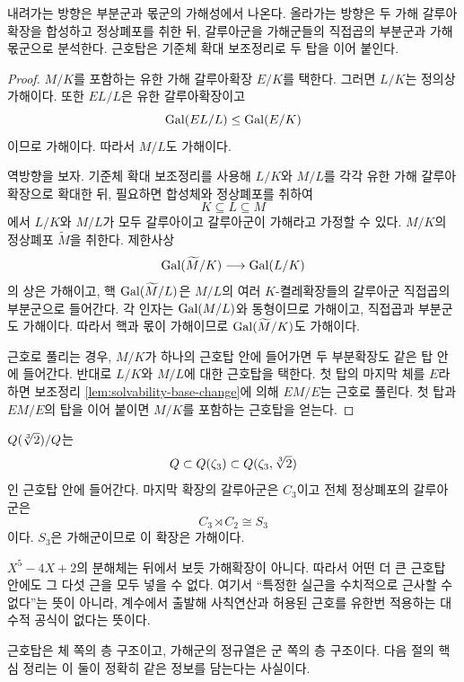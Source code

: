 \begin{proofidea}
내려가는 방향은 부분군과 몫군의 가해성에서 나온다. 올라가는 방향은 두 가해 갈루아확장을 합성하고 정상폐포를 취한 뒤, 갈루아군을 가해군들의 직접곱의 부분군과 가해 몫군으로 분석한다. 근호탑은 기준체 확대 보조정리로 두 탑을 이어 붙인다.
\end{proofidea}

\begin{proof}
$M/K$를 포함하는 유한 가해 갈루아확장 $E/K$를 택한다. 그러면 $L/K$는 정의상 가해이다. 또한 $EL/L$은 유한 갈루아확장이고
\[
  \operatorname{Gal}(EL/L)\le\operatorname{Gal}(E/K)
\]
이므로 가해이다. 따라서 $M/L$도 가해이다.

역방향을 보자. 기준체 확대 보조정리를 사용해 $L/K$와 $M/L$를 각각 유한 가해 갈루아확장으로 확대한 뒤, 필요하면 합성체와 정상폐포를 취하여
\[
  K\subseteq L\subseteq M
\]
에서 $L/K$와 $M/L$가 모두 갈루아이고 갈루아군이 가해라고 가정할 수 있다. $M/K$의 정상폐포 $\widetilde M$을 취한다. 제한사상
\[
  \operatorname{Gal}(\widetilde M/K)\longrightarrow\operatorname{Gal}(L/K)
\]
의 상은 가해이고, 핵 $\operatorname{Gal}(\widetilde M/L)$은 $M/L$의 여러 $K$-켤레확장들의 갈루아군 직접곱의 부분군으로 들어간다. 각 인자는 $\operatorname{Gal}(M/L)$와 동형이므로 가해이고, 직접곱과 부분군도 가해이다. 따라서 핵과 몫이 가해이므로 $\operatorname{Gal}(\widetilde M/K)$도 가해이다.

근호로 풀리는 경우, $M/K$가 하나의 근호탑 안에 들어가면 두 부분확장도 같은 탑 안에 들어간다. 반대로 $L/K$와 $M/L$에 대한 근호탑을 택한다. 첫 탑의 마지막 체를 $E$라 하면 보조정리 \ref{lem:solvability-base-change}에 의해 $EM/E$는 근호로 풀린다. 첫 탑과 $EM/E$의 탑을 이어 붙이면 $M/K$를 포함하는 근호탑을 얻는다.
\end{proof}

\begin{example}
$Q(\sqrt[3]{2})/Q$는
\[
  Q\subset Q(\zeta_3)
  \subset Q(\zeta_3,\sqrt[3]{2})
\]
인 근호탑 안에 들어간다. 마지막 확장의 갈루아군은 $C_3$이고 전체 정상폐포의 갈루아군은
\[
  C_3\rtimes C_2\cong S_3
\]
이다. $S_3$은 가해군이므로 이 확장은 가해이다.
\end{example}

\begin{example}
$X^5-4X+2$의 분해체는 뒤에서 보듯 가해확장이 아니다. 따라서 어떤 더 큰 근호탑 안에도 그 다섯 근을 모두 넣을 수 없다. 여기서 ``특정한 실근을 수치적으로 근사할 수 없다''는 뜻이 아니라, 계수에서 출발해 사칙연산과 허용된 근호를 유한번 적용하는 대수적 공식이 없다는 뜻이다.
\end{example}

\begin{keyidea}
근호탑은 체 쪽의 층 구조이고, 가해군의 정규열은 군 쪽의 층 구조이다. 다음 절의 핵심 정리는 이 둘이 정확히 같은 정보를 담는다는 사실이다.
\end{keyidea}


